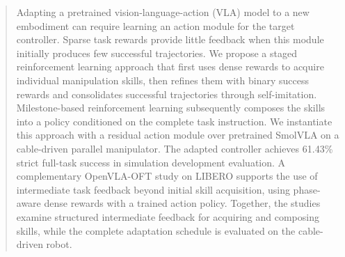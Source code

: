 \begin{abstract}
Adapting a pretrained vision-language-action (VLA) model to a new embodiment can require learning an action module for the target controller. Sparse task rewards provide little feedback when this module initially produces few successful trajectories. We propose a staged reinforcement learning approach that first uses dense rewards to acquire individual manipulation skills, then refines them with binary success rewards and consolidates successful trajectories through self-imitation. Milestone-based reinforcement learning subsequently composes the skills into a policy conditioned on the complete task instruction. We instantiate this approach with a residual action module over pretrained SmolVLA on a cable-driven parallel manipulator. The adapted controller achieves 61.43\% strict full-task success in simulation development evaluation. A complementary OpenVLA-OFT study on LIBERO supports the use of intermediate task feedback beyond initial skill acquisition, using phase-aware dense rewards with a trained action policy.  Together, the studies examine structured intermediate feedback for acquiring and composing skills, while the complete adaptation schedule is evaluated on the cable-driven robot.
\end{abstract}
